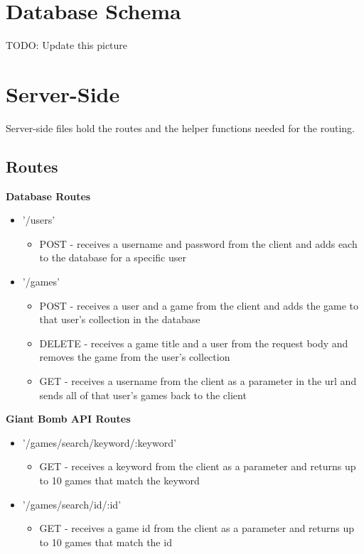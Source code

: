 \documentclass{article}
\begin{document}
\section{Database Schema}
TODO: Update this picture

\section{Server-Side}
Server-side files hold the routes and the helper functions needed for the routing.
\subsection{Routes}
\textbf{Database Routes}
\begin{itemize}
  \item '/users'
  \begin{itemize}
    \item POST - receives a username and password from the client and adds each to the database for a specific user
  \end{itemize}
  \item '/games'
  \begin{itemize}
    \item POST - receives a user and a game from the client and adds the game to that user's collection in the database
    \item DELETE - receives a game title and a user from the request body and removes the game from the user’s collection
    \item GET - receives a username from the client as a parameter in the url and sends all of that user’s games back to the client
  \end{itemize}
\end{itemize}
\textbf{Giant Bomb API Routes}
\begin{itemize}
  \item '/games/search/keyword/:keyword'
  \begin{itemize}
    \item GET - receives a keyword from the client as a parameter and returns up to 10 games that match the keyword
  \end{itemize}
  \item '/games/search/id/:id'
  \begin{itemize}
    \item GET - receives a game id from the client as a parameter and returns up to 10 games that match the id
  \end{itemize}
\end{itemize}
\end{document}
